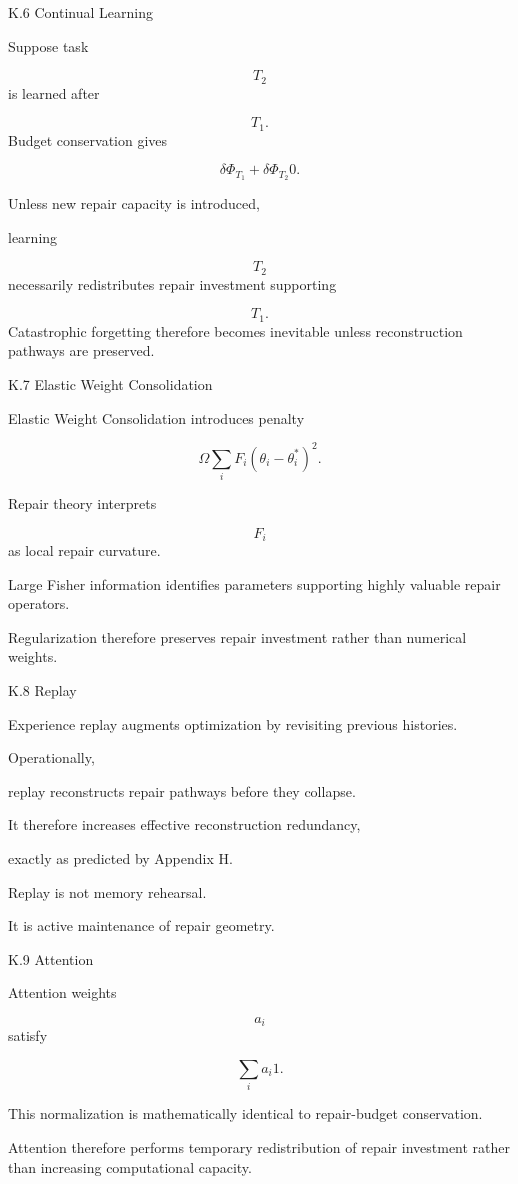 \documentclass[12pt,oneside]{article}
\theoremstyle{plain}
\theoremstyle{definition}
\theoremstyle{remark}
\begin{document}
K.6 Continual Learning

Suppose task

\[
T_2
\]
is learned after

\[
T_1.
\]
Budget conservation gives

\[
\delta\Phi_{T_1}
+
\delta\Phi_{T_2}
0. 

\]

Unless new repair capacity is introduced,

learning

\[
T_2
\]
necessarily redistributes repair investment supporting

\[
T_1.
\]
Catastrophic forgetting therefore becomes inevitable unless reconstruction pathways are preserved.


K.7 Elastic Weight Consolidation

Elastic Weight Consolidation introduces penalty

\[
\Omega
\sum_i
F_i
(\theta_i-\theta_i^*)^2.
\]

Repair theory interprets

\[
F_i
\]
as local repair curvature.

Large Fisher information identifies parameters supporting highly valuable repair operators.

Regularization therefore preserves repair investment rather than numerical weights.


K.8 Replay

Experience replay augments optimization by revisiting previous histories.

Operationally,

replay reconstructs repair pathways before they collapse.

It therefore increases effective reconstruction redundancy,

exactly as predicted by Appendix H.

Replay is not memory rehearsal.

It is active maintenance of repair geometry.


K.9 Attention

Attention weights

\[
a_i
\]
satisfy

\[
\sum_i
a_i
1. 

\]

This normalization is mathematically identical to repair-budget conservation.

Attention therefore performs temporary redistribution of repair investment rather than increasing computational capacity.
\end{document}
